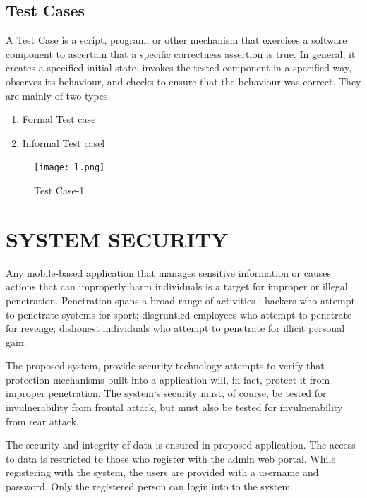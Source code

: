 \documentclass[a4paper,12pt]{article}
\begin{document}
\subsection{Test Cases}\vspace{2mm}
A Test Case is a script, program, or other mechanism that exercises a software component to ascertain that a specific correctness assertion is true. In general, it creates a specified initial state, invokes the tested component in a specified way, observes its behaviour, and checks to ensure that the behaviour was correct. They are mainly of two types.
 \begin{enumerate}
\item Formal Test case
\item Informal Test casel
\end{enumerate}
\newpage
\begin{figure}[h!]
\centering\texttt{[image: l.png]}
\caption{ Test Case-1}
\end{figure}
\newpage
\section{SYSTEM SECURITY}\vspace{5mm}
Any mobile-based application that manages sensitive information or causes actions that can improperly harm individuals is a target for improper or illegal penetration. Penetration spans a broad range of activities : hackers who attempt to penetrate systems for sport; disgruntled employees who attempt to penetrate for revenge; dishonest individuals who attempt to penetrate for illicit personal gain.
\par\vspace{5mm}
The proposed system, provide security technology attempts to verify that protection mechanisms built into a application will, in fact, protect it from improper penetration. The system‘s security must, of course, be tested for invulnerability from frontal attack, but must also be tested for invulnerability from rear attack.
\par\vspace{5mm}
The security and integrity of data is ensured in proposed application. The access to data is restricted to those who register with the admin web portal. While registering with the system, the users are provided with a username and password. Only the registered person can login into to the system.
\newpage
\end{document}
